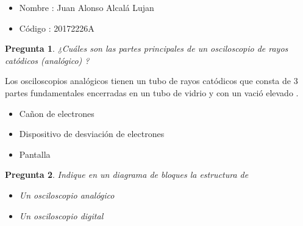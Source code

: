 \documentclass[a4paper,12pt]{article}
\newtheorem{preg}{Pregunta} %
\begin{document}
\begin{itemize}
\item Nombre : Juan Alonso Alcalá Lujan 
\item Código : 20172226A 
\end{itemize}

\begin{preg}
¿Cuáles son las partes principales de un osciloscopio de rayos catódicos (analógico) ? 
\end{preg}

Los osciloscopios analógicos tienen un tubo de rayos catódicos que consta de 3 partes fundamentales encerradas en un tubo de vidrio y con un vació elevado .
\begin{itemize}
\item Cañon de electrones
\item Dispositivo de desviación de electrones
\item Pantalla
\end{itemize}

\begin{preg}
Indique en un diagrama de bloques la estructura de 
\begin{itemize}
\item Un osciloscopio analógico
\item Un osciloscopio digital
\end{itemize}
\end{preg}
\end{document}
